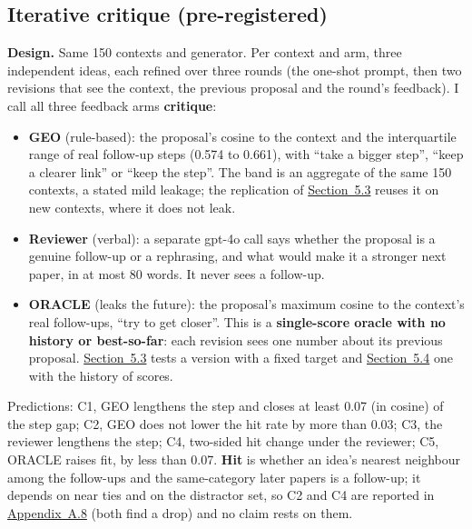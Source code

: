 \documentclass[
  10pt,
]{article}
\providecommand{\tightlist}{%
  \setlength{\itemsep}{0pt}\setlength{\parskip}{0pt}}
\begin{document}
\subsection{Iterative critique (pre-registered)}\label{sec:5.2}

\textbf{Design.} Same 150 contexts and
generator. Per context and arm, three
independent ideas, each refined over
three rounds (the one-shot prompt, then
two revisions that see the context, the
previous proposal and the round's
feedback). I call all three feedback
arms \textbf{critique}:

\begin{itemize}
\tightlist
\item
  \textbf{GEO} (rule-based): the
  proposal's cosine to the context and
  the interquartile range of real
  follow-up steps (0.574 to 0.661), with
  ``take a bigger step'', ``keep a
  clearer link'' or ``keep the step''.
  The band is an aggregate of the same
  150 contexts, a stated mild leakage;
  the replication of
  \hyperref[sec:5.3]{Section~5.3} reuses
  it on new contexts, where it does not
  leak.
\item
  \textbf{Reviewer} (verbal): a separate
  gpt-4o call says whether the proposal
  is a genuine follow-up or a
  rephrasing, and what would make it a
  stronger next paper, in at most 80
  words. It never sees a follow-up.
\item
  \textbf{ORACLE} (leaks the future):
  the proposal's maximum cosine to the
  context's real follow-ups, ``try to
  get closer''. This is a
  \textbf{single-score oracle with no
  history or best-so-far}: each revision
  sees one number about its previous
  proposal.
  \hyperref[sec:5.3]{Section~5.3} tests
  a version with a fixed target and
  \hyperref[sec:5.4]{Section~5.4} one
  with the history of scores.
\end{itemize}

Predictions: C1, GEO lengthens the step
and closes at least 0.07 (in cosine) of
the step gap; C2, GEO does not lower the
hit rate by more than 0.03; C3, the
reviewer lengthens the step; C4,
two-sided hit change under the reviewer;
C5, ORACLE raises fit, by less than
0.07. \textbf{Hit} is whether an idea's
nearest neighbour among the follow-ups
and the same-category later papers is a
follow-up; it depends on near ties and
on the distractor set, so C2 and C4 are
reported in
\hyperref[app:A.8]{Appendix~A.8} (both
find a drop) and no claim rests on them.
\end{document}
